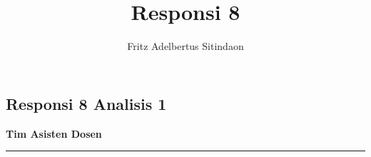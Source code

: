 \documentclass{article}
\title{Responsi 8}
\author{Fritz Adelbertus Sitindaon}
\date{}
\begin{document}
\begin{flushright}
    \section*{Responsi 8 Analisis 1}
    \textbf{Tim Asisten Dosen}
\end{flushright}


\vspace{0.5cm}\hrule height 2pt\vspace{0.5cm}








\end{document}
